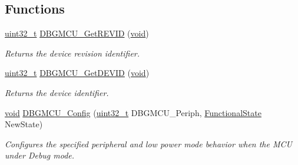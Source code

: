 \subsection*{Functions}
\begin{DoxyCompactItemize}
\item 
\hyperlink{_p_e___types_8h_a33594304e786b158f3fb30289278f5af}{uint32\+\_\+t} \hyperlink{group___d_b_g_m_c_u___exported___functions_ga47419e9ca75ab7be4c70feb82faa0511}{D\+B\+G\+M\+C\+U\+\_\+\+Get\+R\+E\+V\+ID} (\hyperlink{usb__devapi_8h_afabf60e7f57651d6d595a02c75f07cd0}{void})
\begin{DoxyCompactList}\small\item\em Returns the device revision identifier. \end{DoxyCompactList}\item 
\hyperlink{_p_e___types_8h_a33594304e786b158f3fb30289278f5af}{uint32\+\_\+t} \hyperlink{group___d_b_g_m_c_u___exported___functions_gac34193c34dbce759bf424957a31b3266}{D\+B\+G\+M\+C\+U\+\_\+\+Get\+D\+E\+V\+ID} (\hyperlink{usb__devapi_8h_afabf60e7f57651d6d595a02c75f07cd0}{void})
\begin{DoxyCompactList}\small\item\em Returns the device identifier. \end{DoxyCompactList}\item 
\hyperlink{usb__devapi_8h_afabf60e7f57651d6d595a02c75f07cd0}{void} \hyperlink{group___d_b_g_m_c_u___exported___functions_gadf2f267f855ac1e4c03905c5dcfbd28b}{D\+B\+G\+M\+C\+U\+\_\+\+Config} (\hyperlink{_p_e___types_8h_a33594304e786b158f3fb30289278f5af}{uint32\+\_\+t} D\+B\+G\+M\+C\+U\+\_\+\+Periph, \hyperlink{agilefox_2library_2inc_2stm32f10x__type_8h_ac9a7e9a35d2513ec15c3b537aaa4fba1}{Functional\+State} New\+State)
\begin{DoxyCompactList}\small\item\em Configures the specified peripheral and low power mode behavior when the M\+CU under Debug mode. \end{DoxyCompactList}\end{DoxyCompactItemize}
